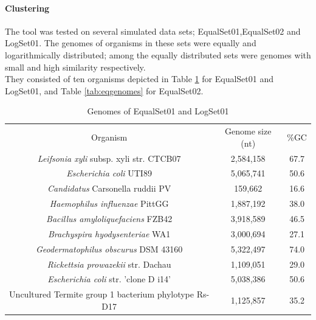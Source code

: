 \documentclass[twocolumn]{bmcart}%
\begin{document}
\paragraph*{Clustering}
The tool was tested on several simulated data sets; EqualSet01,EqualSet02 and LogSet01. The genomes of organisms in these sets were equally and logarithmically distributed; among the equally distributed sets were genomes with small and high similarity respectively. \\
They consisted of ten organisms depicted in Table \ref{tab:eqloggenes} for EqualSet01 and LogSet01, and Table \ref{tab:eqgenomes} for EqualSet02.
\begin{table}
	\centering
	\caption{Genomes of EqualSet01 and LogSet01 \cite{Laczny2014}}
	\begin{tabular}{ccc}
		Organism&Genome size (nt)&\%GC\\
		\textit{Leifsonia xyli} subsp.  xyli str.  CTCB07&2,584,158&67.7\\
		\textit{Escherichia coli} UTI89&5,065,741&50.6\\
		\textit{Candidatus}	Carsonella ruddii PV&159,662&16.6\\
		\textit{Haemophilus influenzae}	PittGG&1,887,192&38.0\\
		\textit{Bacillus amyloliquefaciens}	FZB42&3,918,589&46.5\\
		\textit{Brachyspira hyodysenteriae} WA1&3,000,694&27.1\\
		\textit{Geodermatophilus obscurus} DSM 43160&5,322,497&74.0\\
		\textit{Rickettsia prowazekii} str.  Dachau&1,109,051&29.0\\
		\textit{Escherichia coli} str.  ’clone D i14’&5,038,386&50.6\\
		Uncultured Termite group 1 bacterium phylotype Rs-D17&1,125,857&35.2	
	\end{tabular}
\label{tab:eqloggenes}
\end{table}
\end{document}
